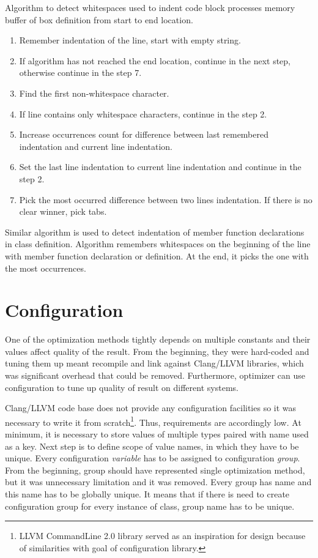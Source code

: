Algorithm to detect whitespaces used to indent code block processes memory buffer of box definition from start to end location.

\begin{enumerate}
\item{Remember indentation of the line, start with empty string.}
\item{If algorithm has not reached the end location, continue in the next step, otherwise continue in the step 7.}
\item{Find the first non-whitespace character.}
\item{If line contains only whitespace characters, continue in the step 2.}
\item{Increase occurrences count for difference between last remembered indentation and current line indentation.}
\item{Set the last line indentation to current line indentation and continue in the step 2.}
\item{Pick the most occurred difference between two lines indentation. If there is no clear winner, pick tabs.}
\end{enumerate}

Similar algorithm is used to detect indentation of member function declarations in class definition. Algorithm remembers whitespaces on the beginning of the line with member function declaration or definition. At the end, it picks the one with the most occurrences.

\section{Configuration}
\label{opt-configuration}
One of the optimization methods tightly depends on multiple constants and their values affect quality of the result. From the beginning, they were hard-coded and tuning them up meant recompile and link against Clang/LLVM libraries, which was significant overhead that could be removed. Furthermore, optimizer can use configuration to tune up quality of result on different systems.

Clang/LLVM code base does not provide any configuration facilities so it was necessary to write it from scratch\footnote{LLVM CommandLine 2.0 library served as an inspiration for design because of similarities with goal of configuration library.}. Thus, requirements are accordingly low. At minimum, it is necessary to store values of multiple types paired with name used as a key. Next step is to define scope of value names, in which they have to be unique. Every configuration \emph{variable} has to be assigned to configuration \emph{group}. From the beginning, group should have represented single optimization method, but it was unnecessary limitation and it was removed. Every group has name and this name has to be globally unique. It means that if there is need to create configuration group for every instance of class, group name has to be unique.

